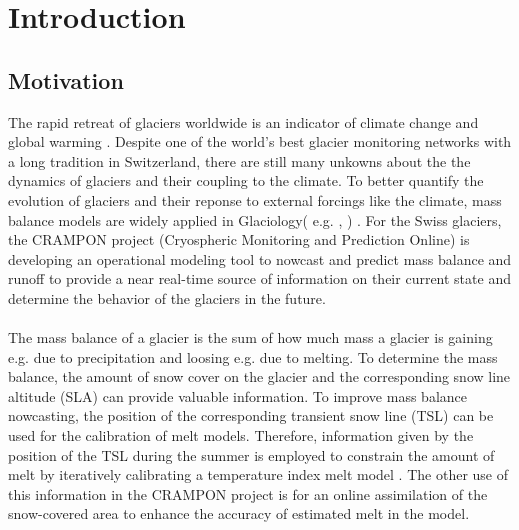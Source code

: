 \documentclass[12pt]{article}
\begin{document}
\tableofcontents %
\thispagestyle{empty}

\newpage


\setcounter{page}{1}
\section{Introduction}
\subsection{Motivation}
The rapid  retreat of glaciers worldwide is an indicator of climate change and global warming \cite{Barry2006}. Despite one of the world's best glacier monitoring networks with a long tradition in Switzerland, there are still many unkowns about the the dynamics of glaciers and their coupling to the climate. To better quantify the evolution of glaciers and their reponse to external forcings like the climate, mass balance models are widely applied in Glaciology( e.g. \cite{Huss2008}, \cite{Zemp2009}) .
For the Swiss glaciers, the CRAMPON project (Cryospheric Monitoring and Prediction Online) is developing an operational modeling tool to nowcast and predict mass balance and runoff to provide a near real-time source of information on their current state and determine the behavior of the glaciers in the future. \\
\\
The mass balance of a glacier is the sum of how much mass a glacier is gaining e.g. due to precipitation and loosing e.g. due to melting. To determine the mass balance, the amount of snow cover on the glacier and the corresponding snow line altitude (SLA) can provide valuable information.
To improve mass balance nowcasting, the position of the corresponding transient snow line (TSL) can be used for the calibration of melt models. Therefore, information given by the position of the TSL during the summer is employed to constrain the amount of melt by iteratively calibrating a temperature index melt model \cite{Barandun2018}. 
The other use of this information in the CRAMPON project is for an online assimilation of the snow-covered area to enhance the accuracy of estimated melt in the model. \\
\\
\end{document}

